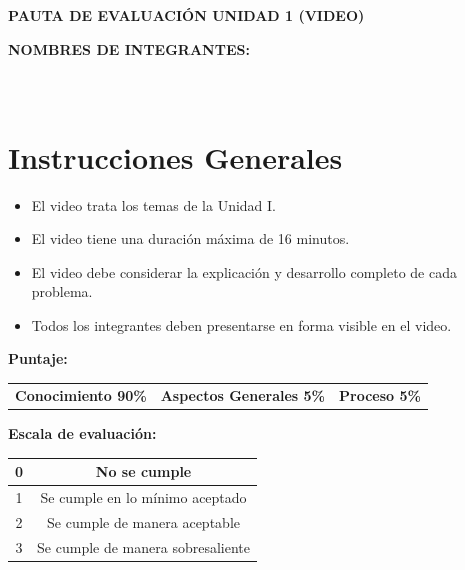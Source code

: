 \documentclass[12pt]{article}
\begin{document}
	
	\begin{center}
		{\Large \textbf{PAUTA DE EVALUACIÓN UNIDAD 1 (VIDEO)}}\\[0.5cm]
	\end{center}
	
	\textbf{NOMBRES DE INTEGRANTES:}\\[0.3cm]
	\hrulefill\\[0.3cm]
	\hrulefill\\[0.3cm]
	\hrulefill
	
	\vspace{0.5cm}
	
	\section*{Instrucciones Generales}
	
	\begin{itemize}
		\item El video trata los temas de la Unidad I.
		\item El video tiene una duración máxima de 16 minutos.
		\item El video debe considerar la explicación y desarrollo completo de cada problema.
		\item Todos los integrantes deben presentarse en forma visible en el video.
	\end{itemize}
	
	\vspace{0.3cm}
	
	\textbf{Puntaje:}
	
	\begin{center}
		\begin{tabular}{c c c}
			\textbf{Conocimiento 90\%} & \textbf{Aspectos Generales 5\%} & \textbf{Proceso 5\%}
		\end{tabular}
	\end{center}
	
	\vspace{0.3cm}
	
	\textbf{Escala de evaluación:}
	
	\begin{center}
		\begin{tabular}{|c|c|}
			\hline
			0 & No se cumple \\
			\hline
			1 & Se cumple en lo mínimo aceptado \\
			\hline
			2 & Se cumple de manera aceptable \\
			\hline
			3 & Se cumple de manera sobresaliente \\
			\hline
		\end{tabular}
	\end{center}
	
\end{document}
